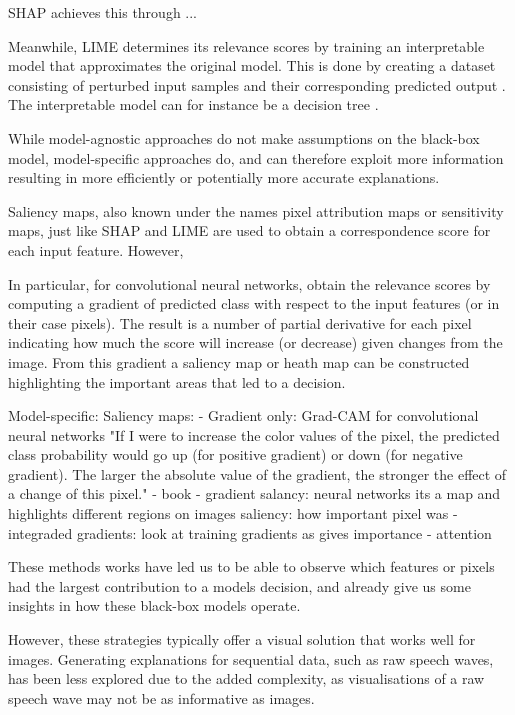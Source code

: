 SHAP achieves this through ... %

Meanwhile, LIME determines its relevance scores by training an interpretable model that approximates the original model. This is done by creating a dataset consisting of perturbed input samples and their corresponding predicted output  \citep{ribeiroWhyShouldTrust2016}. The interpretable model can for instance be a decision tree \citep{molnarInterpretableMachineLearning2022}.

While model-agnostic approaches do not make assumptions on the black-box model, model-specific approaches do, and can therefore exploit more information resulting in more efficiently or potentially more accurate explanations.

Saliency maps, also known under the names pixel attribution maps or sensitivity maps, just like SHAP and LIME are used to obtain a correspondence score for each input feature. However,

In particular, for convolutional neural networks, \cite{simonyanDeepConvolutionalNetworks2014} obtain the relevance scores by computing a gradient of predicted class with respect to the input features (or in their case pixels). The result is a number of partial derivative for each pixel indicating how much the score will increase (or decrease) given changes from the image. From this gradient a saliency map or heath map can be constructed highlighting the important areas that led to a decision. 




Model-specific:
Saliency maps:
	- Gradient only: Grad-CAM for convolutional neural networks "If I were to increase the color values of the pixel, the predicted class probability would go up (for positive gradient) or down (for negative gradient). The larger the absolute value of the gradient, the stronger the effect of a change of this pixel." - book
	- gradient salancy: neural networks
			its a map and highlights different regions on images
			saliency: how important pixel was
		- integraded gradients: look at training gradients as gives importance
	- attention

	These methods works have led us to be able to observe which features or pixels had the largest contribution to a models decision, and already give us some insights in how these black-box models operate. 
	
	However, these strategies typically offer a visual solution that works well for images. Generating explanations for sequential data, such as raw speech waves, has been less explored due to the added complexity, as visualisations of a raw speech wave may not be as informative as images.
	
